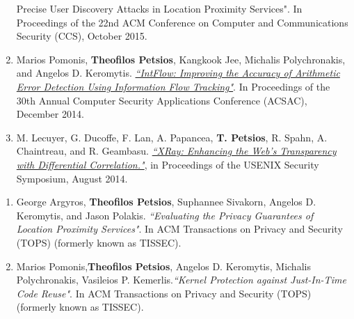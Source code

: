 \begin{cvparagraph}
\begin{enumerate}[label=C\arabic*]
{{        Precise User Discovery Attacks in Location Proximity Services"}}. In
        Proceedings of the 22nd ACM Conference on Computer and Communications
        Security (CCS), October 2015.\label{itm:istalker}
    \item Marios Pomonis, \textbf{Theofilos Petsios}, Kangkook Jee, Michalis
        Polychronakis, and Angelos D. Keromytis. \href{http://www.cs.columbia.edu/~theofilos/files/papers/2014/intflow.pdf}{\textit{``IntFlow: Improving
        the Accuracy of Arithmetic Error Detection Using Information Flow
        Tracking"}}. In Proceedings of the 30th Annual Computer Security
        Applications Conference (ACSAC), December 2014.\label{itm:intflow}
    \item M. Lecuyer, G. Ducoffe, F. Lan, A. Papancea, \textbf{T. Petsios}, R.
        Spahn, A. Chaintreau, and R. Geambasu. \href{http://www.cs.columbia.edu/~theofilos/files/papers/2014/xray.pdf}{\textit{``XRay: Enhancing the
        Web's Transparency with Differential Correlation."}}, in Proceedings of
        the USENIX Security Symposium, August 2014.\label{itm:xray}
\end{enumerate}
\end{cvparagraph}

\begin{cvparagraph}
\begin{enumerate}[label=J\arabic*]
    \item George Argyros, \textbf{Theofilos Petsios}, Suphannee Sivakorn,
        Angelos D. Keromytis, and Jason Polakis. \textit{``Evaluating the
        Privacy Guarantees of Location Proximity Services"}. In ACM
        Transactions on Privacy and Security (TOPS) (formerly known as
        TISSEC).\label{itm:istalker_tops}
    \item Marios Pomonis,\textbf{Theofilos Petsios}, Angelos D. Keromytis,
        Michalis Polychronakis, Vasileios P. Kemerlis.\textit{``Kernel
        Protection against Just-In-Time Code Reuse"}. In ACM Transactions on
        Privacy and Security (TOPS) (formerly known as
        TISSEC).\label{itm:krx_tops}
\end{enumerate}
\end{cvparagraph}

